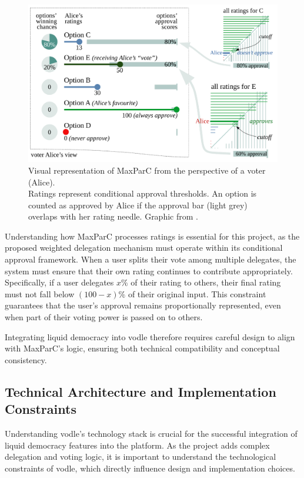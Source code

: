 \begin{figure}[H]
  \centering
  \includegraphics[width=0.8\linewidth]{../common/maxparc.png}
  \caption{Visual representation of MaxParC from the perspective of a voter (Alice). \\ Ratings represent conditional approval thresholds. An option is counted as approved by Alice if the approval bar (light grey) overlaps with her rating needle. Graphic from \citet{heitzig_fair_2024}.}
\end{figure}

Understanding how MaxParC processes ratings is essential for this project, as the proposed weighted delegation mechanism must operate within its conditional approval framework. When a user splits their vote among multiple delegates, the system must ensure that their own rating continues to contribute appropriately. Specifically, if a user delegates $x\%$ of their rating to others, their final rating must not fall below $(100-x)\%$ of their original input. This constraint guarantees that the user's approval remains proportionally represented, even when part of their voting power is passed on to others.

Integrating liquid democracy into vodle therefore requires careful design to align with MaxParC's logic, ensuring both technical compatibility and conceptual consistency.

\subsection{Technical Architecture and Implementation Constraints}
Understanding vodle's technology stack is crucial for the successful integration of liquid democracy features into the platform. As the project adds complex delegation and voting logic, it is important to understand the technological constraints of vodle, which directly influence design and implementation choices.

